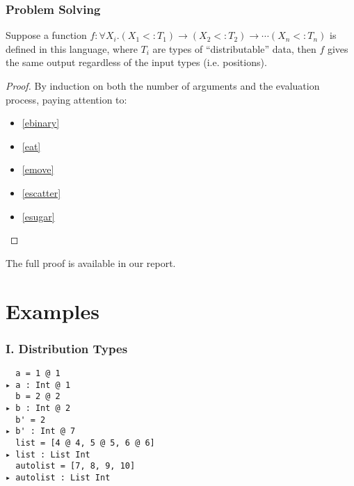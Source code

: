\documentclass{beamer}
\newcommand{\su}{{<:}}
\begin{document}
\begin{frame}
  \frametitle{Problem Solving}

  \begin{theorem}
    \upshape
    Suppose a function $f: \texttt{∀}X_i. (X_1\su T_1)\to (X_2\su T_2)\to\cdots (X_n\su T_n)$ is defined in this language, where $T_i$ are types of ``distributable'' data, then $f$ gives the same output regardless of the input types (i.e. positions).
  \end{theorem}
  \begin{proof}
    By induction on both the number of arguments and the evaluation process, paying attention to:
    \begin{itemize}
      \item \ref{ebinary}
      \item \ref{eat}
      \item \ref{emove}
      \item \ref{escatter}
      \item \ref{esugar}
    \end{itemize}
  \end{proof}

  The full proof is available in our report.

\end{frame}
\section{Examples}

\begin{frame}[fragile]
\frametitle{I. Distribution Types}

\begin{example}
    \verb|  a = 1 @ 1|
    \\
    \verb|▸ a : Int @ 1|
    \\
    \verb|  b = 2 @ 2|
    \\
    \verb|▸ b : Int @ 2|
    \\
    \verb|  b' = 2|
    \\
    \verb|▸ b' : Int @ 7|
    \\
    \verb|  list = [4 @ 4, 5 @ 5, 6 @ 6]|
    \\
    \verb|▸ list : List Int|
    \\
    \verb|  autolist = [7, 8, 9, 10]|
    \\
    \verb|▸ autolist : List Int|
\end{example}

\end{frame}
\end{document}
